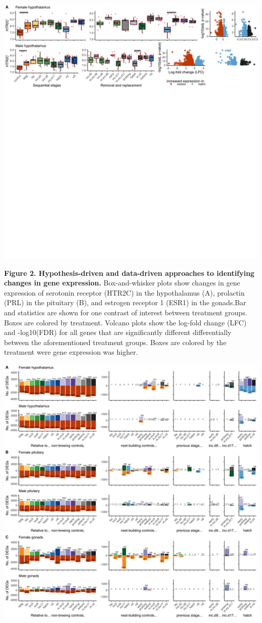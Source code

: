 \includegraphics[width=0.95\linewidth]{fig2-1}

\textbf{Figure 2. Hypothesis-driven and data-driven approaches to
identifying changes in gene expression.} Box-and-whisker plots show
changes in gene expression of serotonin receptor (HTR2C) in the
hypothalamus (A), prolactin (PRL) in the pituitary (B), and estrogen
receptor 1 (ESR1) in the gonads.Bar and statistics are shown for one
contrast of interest between treatment groups. Boxes are colored by
treatment. Volcano plots show the log-fold change (LFC) and -log10(FDR)
for all genes that are significantly different differentially between
the aforementioned treatment groups. Boxes are colored by the treatment
were gene expression was higher.

\includegraphics[width=0.95\linewidth]{fig3-1}

